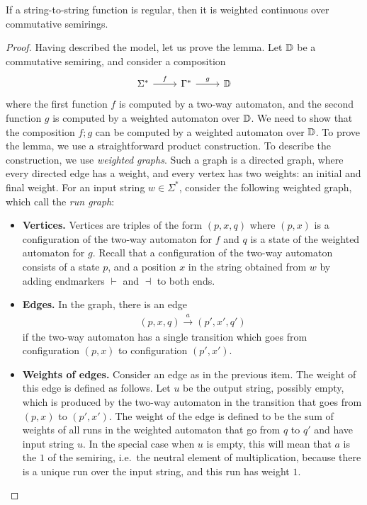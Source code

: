\begin{theorem}\label{thm:regular-continuous-commutative-semirings}
    If a string-to-string function is  regular, then it is weighted continuous over commutative semirings.
\end{theorem}
\begin{proof}

    Having described the model, let us prove the lemma.
        Let $\mathbb D$ be a commutative semiring, and  consider  a composition 
    \[
    \begin{tikzcd}
    \Sigma^* 
    \ar[r,"f"]
    & 
    \Gamma^*
    \ar[r,"g"]
    &
    \domain
    \end{tikzcd}
    \]
    where the first function $f$ is computed by a two-way automaton, and the second function $g$ is computed by a weighted automaton over $\mathbb D$. We need to show that the composition $f;g$ can be computed by a weighted automaton over $\mathbb D$. To prove the lemma, we use a straightforward product construction. To describe the construction, we use \emph{weighted graphs}. Such a graph is a directed graph, where every directed edge has a weight, and every vertex has two weights: an initial and final weight. For an input string $w \in \Sigma^*$, consider the following weighted graph, which call the \emph{run graph}:
    \begin{itemize}
        \item \textbf{Vertices.} Vertices are triples of the form $(p,x,q)$ where $(p,x)$ is a configuration of the two-way automaton for $f$ and  $q$ is a state of the weighted automaton for $g$. Recall that a configuration of the two-way automaton consists of a state $p$, and a position  $x$  in the string obtained from $w$ by adding endmarkers $\vdash$ and $\dashv$ to both ends. 
        \item \textbf{Edges.} In the graph, there is an edge 
        \begin{align*}
        (p,x,q) \xrightarrow{a} (p',x',q')
        \end{align*}
        if the two-way automaton has a single transition which goes from configuration $(p,x)$ to configuration $(p',x')$.
        \item \textbf{Weights of edges.} Consider an edge as in the previous item. The weight of this edge is defined as follows. Let $u$ be the output string, possibly empty, which is produced by the two-way automaton in the transition that goes from $(p,x)$ to $(p',x')$. The weight of the edge is defined to be the  sum of weights of all runs in the weighted automaton that go from $q$ to $q'$ and have input string $u$. In the special case when $u$ is empty, this will mean that $a$ is the $1$ of the semiring, i.e.~the neutral element of multiplication, because there is a unique run over the input string, and this run has weight $1$. 

\end{itemize}
\end{proof}
